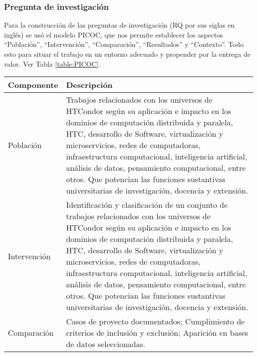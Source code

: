 \subsubsection{Pregunta de investigación}
Para la construcción de las preguntas de investigación (RQ por sus siglas en inglés) se usó el modelo PICOC, que nos permite establecer los aspectos ``Población'', ``Intervención'', ``Comparación'', ``Resultados'' y ``Contexto''. Todo esto para situar el trabajo en un entorno adecuado y propender por la entrega de valor. Ver Tabla \ref{table:PICOC}.

\begin{table}[htbp]
	
	\centering
	\renewcommand{\arraystretch}{1.7}  %
	\setlength{\tabcolsep}{3pt}      %
	\vspace{10pt}                     %
	\begin{tabular}{|>{\arraybackslash}m{1.7cm}|>{\arraybackslash}m{6.3cm}|}
		\hline	
		\textbf{Componente} & \textbf{Descripción} \\
		
		\hline
		Población & Trabajos relacionados con los universos de HTCondor según su aplicación e impacto en los dominios de computación distribuida y paralela, HTC, desarrollo de Software, virtualización y microservicios, redes de computadoras, infraestructura computacional, inteligencia artificial, análisis de datos, pensamiento computacional, entre otros. Que potencian las funciones sustantivas universitarias de investigación, docencia y extensión.\\
		
		\hline
		Intervención & Identificación y clasificación de un conjunto de trabajos relacionados con los universos de HTCondor según su aplicación e impacto en los dominios de computación distribuida y paralela, HTC, desarrollo de Software, virtualización y microservicios, redes de computadoras, infraestructura computacional, inteligencia artificial, análisis de datos, pensamiento computacional, entre otros. Que potencian las funciones sustantivas universitarias de investigación, docencia y extensión.\\
		
		\hline
		Comparación & Casos de proyecto documentados; Cumplimiento de criterios de inclusión y exclusión;
		Aparición en bases de datos seleccionadas.\\
		

\end{tabular}
\end{table}
